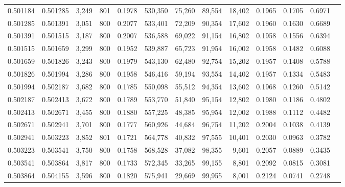 \begin{tabular}{rrrrrrrrrrrrr}
0.501184 & 0.501285 & 3,249 & 801 &                                     0.1978 & 530,350 &  75,260 &  89,554 &  18,402 & 0.1965 & 0.1705 & 0.6971 \\
0.501285 & 0.501391 & 3,051 & 800 &                                     0.2077 & 533,401 &  72,209 &  90,354 &  17,602 & 0.1960 & 0.1630 & 0.6689 \\
0.501391 & 0.501515 & 3,187 & 800 &                                     0.2007 & 536,588 &  69,022 &  91,154 &  16,802 & 0.1958 & 0.1556 & 0.6394 \\
0.501515 & 0.501659 & 3,299 & 800 &                                     0.1952 & 539,887 &  65,723 &  91,954 &  16,002 & 0.1958 & 0.1482 & 0.6088 \\
0.501659 & 0.501826 & 3,243 & 800 &                                     0.1979 & 543,130 &  62,480 &  92,754 &  15,202 & 0.1957 & 0.1408 & 0.5788 \\
0.501826 & 0.501994 & 3,286 & 800 &                                     0.1958 & 546,416 &  59,194 &  93,554 &  14,402 & 0.1957 & 0.1334 & 0.5483 \\
0.501994 & 0.502187 & 3,682 & 800 &                                     0.1785 & 550,098 &  55,512 &  94,354 &  13,602 & 0.1968 & 0.1260 & 0.5142 \\
0.502187 & 0.502413 & 3,672 & 800 &                                     0.1789 & 553,770 &  51,840 &  95,154 &  12,802 & 0.1980 & 0.1186 & 0.4802 \\
0.502413 & 0.502671 & 3,455 & 800 &                                     0.1880 & 557,225 &  48,385 &  95,954 &  12,002 & 0.1988 & 0.1112 & 0.4482 \\
0.502671 & 0.502941 & 3,701 & 800 &                                     0.1777 & 560,926 &  44,684 &  96,754 &  11,202 & 0.2004 & 0.1038 & 0.4139 \\
0.502941 & 0.503223 & 3,852 & 801 &                                     0.1721 & 564,778 &  40,832 &  97,555 &  10,401 & 0.2030 & 0.0963 & 0.3782 \\
0.503223 & 0.503541 & 3,750 & 800 &                                     0.1758 & 568,528 &  37,082 &  98,355 &   9,601 & 0.2057 & 0.0889 & 0.3435 \\
0.503541 & 0.503864 & 3,817 & 800 &                                     0.1733 & 572,345 &  33,265 &  99,155 &   8,801 & 0.2092 & 0.0815 & 0.3081 \\
0.503864 & 0.504155 & 3,596 & 800 &                                     0.1820 & 575,941 &  29,669 &  99,955 &   8,001 & 0.2124 & 0.0741 & 0.2748 \\

\end{tabular}
